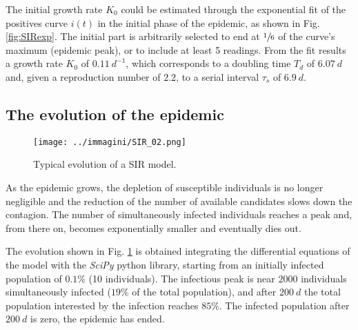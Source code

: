 \documentclass[DIV=12, BCOR=0pt]{scrartcl}  %
\begin{document}
	The initial growth rate $K_{0}$ could be estimated through the exponential fit of the positives curve $i(t)$ in the initial phase of the epidemic, as shown in Fig. \ref{fig:SIRexp}. The initial part is arbitrarily selected to end at $\sfrac{1}{6}$ of the curve's maximum (epidemic peak), or to include at least 5 readings. From the fit results a growth rate $K_{0}$ of $0.11 \ d^{-1}$, which corresponds to a doubling time $T_{d}$ of $6.07 \ d$ and, given a reproduction number of $2.2$, to a serial interval $\tau_{s}$ of $6.9 \ d$.

  \subsection{The evolution of the epidemic}
  
  \begin{figure}[h!]
  	\centering
  	\texttt{[image: ../immagini/SIR\_02.png]}
  	\caption{Typical evolution of a SIR model. }
  	\label{fig:SIRtot}
  \end{figure}

  As the epidemic grows, the depletion of susceptible individuals is no longer negligible and the reduction of the number of available candidates slows down the contagion. The number of simultaneously infected individuals reaches a peak and, from there on, becomes exponentially smaller and eventually dies out.
  
  The evolution shown in Fig. \ref{fig:SIRtot} %
  is obtained integrating the differential equations of the model with the \textit{SciPy} python library, starting from an initially infected population of $0.1 \%$ (10 individuals). The infectious peak is near $2000$ individuals simultaneously infected ($19 \%$ of the total population), and after $200 \ d$ the total population interested by the infection reaches $85 \%$. The infected population after $200 \ d$ is zero, the epidemic has ended. \\
  
  
  
\end{document}
